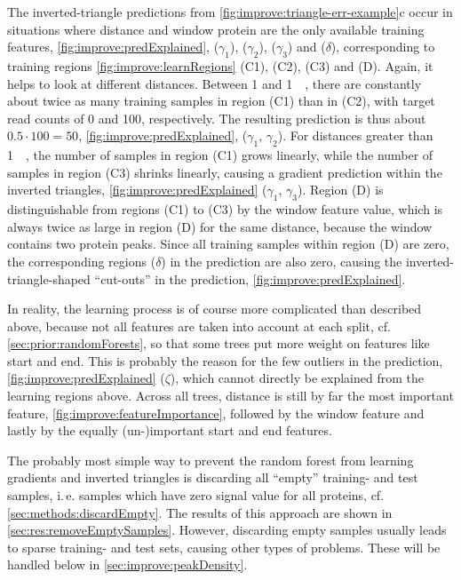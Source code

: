The inverted-triangle predictions from \autoref{fig:improve:triangle-err-example}c occur in situations 
where distance and window protein are the only available training features, 
\autoref{fig:improve:predExplained}, ($\gamma_1$), ($\gamma_2$), ($\gamma_3$) and ($\delta$),
corresponding to training regions \autoref{fig:improve:learnRegions} (C1), (C2), (C3) and (D).
Again, it helps to look at different distances. Between \SI{1}{\bp} and \SI{1}{\mega\bp},
there are constantly about twice as many training samples
in region (C1) than in (C2), with target read counts of 0 and 100, respectively. 
The resulting prediction is thus about $0.5\cdot100 = 50$, \autoref{fig:improve:predExplained}, ($\gamma_1,\,\gamma_2$). 
For distances greater than \SI{1}{\mega\bp}, the number of samples in region (C1) grows linearly, 
while the number of samples in region (C3) shrinks linearly, causing a gradient prediction within the inverted triangles, 
\autoref{fig:improve:predExplained} ($\gamma_1$, $\gamma_3$).
Region (D) is distinguishable from regions (C1) to (C3) by the window feature value, 
which is always twice as large in region (D) for the same distance, because the window contains two protein peaks.
Since all training samples within region (D) are zero, 
the corresponding regions ($\delta$) in the prediction are also zero,
causing the inverted-triangle-shaped ``cut-outs'' in the prediction, \autoref{fig:improve:predExplained}.

In reality, the learning process is of course more complicated than described above, 
because not all features are taken into account at each split, cf.\;\autoref{sec:prior:randomForests}, 
so that some trees put more weight on features like start and end.
This is probably the reason for the few outliers in the prediction, \autoref{fig:improve:predExplained} ($\zeta$), 
which cannot directly be explained from the learning regions above.
Across all trees, distance is still by far the most important feature, \autoref{fig:improve:featureImportance},
followed by the window feature and lastly by the equally (un-)important start and end features.

The probably most simple way to prevent the random forest from learning gradients and inverted triangles 
is discarding all ``empty'' training- and test samples, i.\,e. samples which have zero signal value for all proteins, cf.\;\autoref{sec:methods:discardEmpty}.
The results of this approach are shown in \autoref{sec:res:removeEmptySamples}.
However, discarding empty samples usually leads to sparse training- and test sets, causing other types of problems.
These will be handled below in \autoref{sec:improve:peakDensity}.

